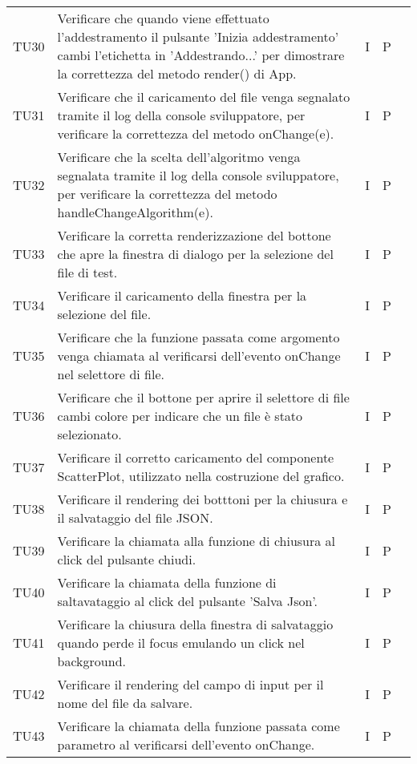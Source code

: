 \begin{longtable} {
		>{}p{15mm} 
		>{}p{79.5mm}
		>{}p{15mm} 
		>{}p{15mm}
		>{}p{0mm}}
	TU30	& Verificare che quando viene effettuato l'addestramento il pulsante 'Inizia addestramento' cambi l'etichetta in 'Addestrando...' per dimostrare la correttezza del metodo render() di App. & I & P &\TBstrut \\ [2mm]
	TU31	& Verificare che il caricamento del file venga segnalato tramite il log della console sviluppatore, per verificare la correttezza del metodo onChange(e). & I & P &\TBstrut \\ [2mm]
	TU32	& Verificare che la scelta dell'algoritmo venga segnalata tramite il log della console sviluppatore, per verificare la correttezza del metodo handleChangeAlgorithm(e). & I & P &\TBstrut \\ [2mm]
	TU33	& Verificare la corretta renderizzazione del bottone che apre la finestra di dialogo per la selezione del file di test. & I & P &\TBstrut \\ [2mm]
	TU34	& Verificare il caricamento della finestra per la selezione del file. & I & P &\TBstrut \\ [2mm]
	TU35	& Verificare che la funzione passata come argomento venga chiamata al verificarsi dell'evento onChange nel selettore di file. & I & P &\TBstrut \\ [2mm]
	TU36	& Verificare che il bottone per aprire il selettore di file cambi colore per indicare che un file è stato selezionato. & I & P &\TBstrut \\ [2mm]
	TU37	& Verificare il corretto caricamento del componente ScatterPlot, utilizzato nella costruzione del grafico. & I & P &\TBstrut \\ [2mm]
	TU38	& Verificare il rendering dei botttoni per la chiusura e il salvataggio del file JSON. & I & P &\TBstrut \\ [2mm]
	TU39	& Verificare la chiamata alla funzione di chiusura al click del pulsante chiudi. & I & P &\TBstrut \\ [2mm]
	TU40	& Verificare la chiamata della funzione di saltavataggio al click del pulsante 'Salva Json'. & I & P &\TBstrut \\ [2mm]
	TU41	& Verificare la chiusura della finestra di salvataggio quando perde il focus emulando un click nel background. & I & P &\TBstrut \\ [2mm]
	TU42	& Verificare il rendering del campo di input per il nome del file da salvare. & I & P &\TBstrut \\ [2mm]
	TU43	& Verificare la chiamata della funzione passata come parametro al verificarsi dell'evento onChange. & I & P &\TBstrut \\ [2mm]

\end{longtable}
